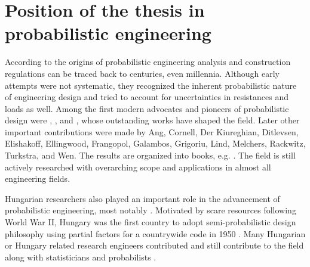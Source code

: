 \section{Position of the thesis in probabilistic engineering} 

According to \citet{Nowak2000} the origins of probabilistic engineering analysis and construction regulations can be traced back to centuries, even millennia. Although early attempts were not systematic, they recognized the inherent probabilistic nature of engineering design and tried to account for uncertainties in resistances and loads as well. Among the first modern advocates and pioneers of probabilistic design were \citet{Kazinczy1921}, \citet{Mayer1926}, and \citet{Freudenthal1947}, whose outstanding works have shaped the field.
Later other important contributions were made by Ang, Cornell, Der Kiureghian, Ditlevsen,  Elishakoff, Ellingwood, Frangopol, Galambos, Grigoriu, Lind, Melchers, Rackwitz, Turkstra, and Wen.
The results are organized into books, e.g. \citet{Melchers2002,Ditlevsen2007,Nowak2000,Elishakoff2004,Ang2006,Cornell1967,Cristensen1982}.
The field is still  actively researched with overarching scope and applications in almost all engineering fields.

Hungarian researchers also played an important role in the advancement of probabilistic engineering, most notably \citet{Kazinczy1921}. Motivated by scare resources following World War II, Hungary was the first country to adopt semi-probabilistic design philosophy using partial factors for a countrywide code in 1950 \citep{Menyhard1951}. Many Hungarian or Hungary related research engineers contributed and still contribute to the field \citep{Misteth2001, Koris2009, Szalai2011, Logo2011, Rad2011, Honfi2013} along with statisticians and probabilists \citep{Renyi1970, Prekopa1995, Habib2000, Szantai2012, Galambos1978}.


